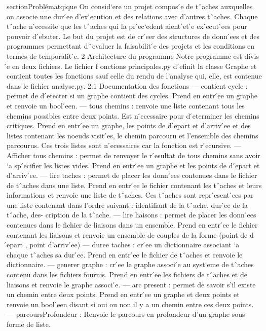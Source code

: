 \documentclass{article}
\begin{document}
section{Problématqique}
On consid`ere un projet compos ́e de tˆaches auxquelles on associe une dur ́ee d’ex ́ecution et des relations avec
d’autres tˆaches. Chaque tˆache n ́ecessite que les tˆaches qui la pr ́ec`edent aient  ́et ́e ex ́ecut ́ees pour pouvoir d ́ebuter.
Le but du projet est de cr ́eer des structures de donn ́ees et des programmes permettant d’ ́evaluer la faisabilit ́e des
projets et les conditions en termes de temporalit ́e.
2 Architecture du programme
Notre programme est divis ́e en deux fichiers. Le fichier f onctions principales.py d ́efinit la classe Graphe
et contient toutes les fonctions sauf celle du rendu de l’analyse qui, elle, est contenue dans le fichier analyse.py.
2.1 Documentation des fonctions
— contient cycle : permet de d ́etecter si un graphe contient des cycles.
Prend en entr ́ee un graphe et renvoie un bool ́een.
— tous chemins : renvoie une liste contenant tous les chemins possibles entre deux points. Est n ́ecessaire
pour d ́eterminer les chemins critiques.
Prend en entr ́ee un graphe, les points de d ́epart et d’arriv ́ee et des listes contenant les noeuds visit ́es, le
chemin parcouru et l’ensemble des chemins parcourus. Ces trois listes sont n ́ecessaires car la fonction est
r ́ecursive.
— Afficher tous chemins : permet de renvoyer le r ́esultat de tous chemins sans avoir `a sp ́ecifier les listes
vides.
Prend en entr ́ee un graphe et les points de d ́epart et d’arriv ́ee.
— lire taches : permet de placer les donn ́ees contenues dans le fichier de tˆaches dans une liste. Prend en
entr ́ee le fichier contenant les tˆaches et leurs informations et renvoie une liste de tˆaches. Ces tˆaches sont
repr ́esent ́ees par une liste contenant dans l’ordre suivant : identifiant de la tˆache, dur ́ee de la tˆache, des-
cription de la tˆache.
— lire liaisons : permet de placer les donn ́ees contenues dans le fichier de liaisons dans un ensemble.
Prend en entr ́ee le fichier contenant les liaisons et renvoie un ensemble de couples de la forme (point de
d ́epart , point d’arriv ́ee)
— duree taches : cr ́ee un dictionnaire associant `a chaque tˆaches sa dur ́ee.
Prend en entr ́ee le fichier de tˆaches et renvoie le dictionnaire.
— generer graphe : cr ́ee le graphe associ ́e au syst`eme de tˆaches contenu dans les fichiers fournis.
Prend en entr ́ee les fichiers de tˆaches et de liaisons et renvoie le graphe associ ́e.
— arc present : permet de savoir s’il existe un chemin entre deux points.
Prend en entr ́ee un graphe et deux points et renvoie un bool ́een disant si oui ou non il y a un chemin entre
ces deux points.
— parcoursProfondeur : Renvoie le parcours en profondeur d’un graphe sous forme de liste.
\end{document}

